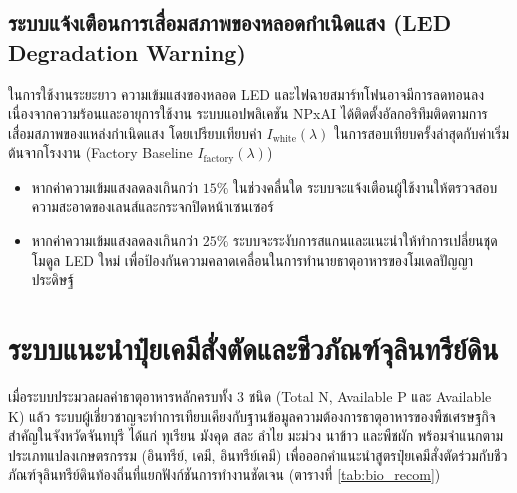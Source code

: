 \documentclass[12pt,a4paper,oneside]{book}
\begin{document}
\subsection{ระบบแจ้งเตือนการเสื่อมสภาพของหลอดกำเนิดแสง (LED Degradation Warning)}
ในการใช้งานระยะยาว ความเข้มแสงของหลอด LED และไฟฉายสมาร์ทโฟนอาจมีการลดทอนลงเนื่องจากความร้อนและอายุการใช้งาน ระบบแอปพลิเคชัน NPxAI ได้ติดตั้งอัลกอริทึมติดตามการเสื่อมสภาพของแหล่งกำเนิดแสง โดยเปรียบเทียบค่า $I_{\text{white}}(\lambda)$ ในการสอบเทียบครั้งล่าสุดกับค่าเริ่มต้นจากโรงงาน (Factory Baseline $I_{\text{factory}}(\lambda)$)
\begin{itemize}
    \item หากค่าความเข้มแสงลดลงเกินกว่า $15\%$ ในช่วงคลื่นใด ระบบจะแจ้งเตือนผู้ใช้งานให้ตรวจสอบความสะอาดของเลนส์และกระจกปิดหน้าเซนเซอร์
    \item หากค่าความเข้มแสงลดลงเกินกว่า $25\%$ ระบบจะระงับการสแกนและแนะนำให้ทำการเปลี่ยนชุดโมดูล LED ใหม่ เพื่อป้องกันความคลาดเคลื่อนในการทำนายธาตุอาหารของโมเดลปัญญาประดิษฐ์
\end{itemize}

\section{ระบบแนะนำปุ๋ยเคมีสั่งตัดและชีวภัณฑ์จุลินทรีย์ดิน}
เมื่อระบบประมวลผลค่าธาตุอาหารหลักครบทั้ง 3 ชนิด (Total N, Available P และ Available K) แล้ว ระบบผู้เชี่ยวชาญจะทำการเทียบเคียงกับฐานข้อมูลความต้องการธาตุอาหารของพืชเศรษฐกิจสำคัญในจังหวัดจันทบุรี ได้แก่ ทุเรียน มังคุด สละ ลำไย มะม่วง นาข้าว และพืชผัก พร้อมจำแนกตามประเภทแปลงเกษตรกรรม (อินทรีย์, เคมี, อินทรีย์เคมี) เพื่อออกคำแนะนำสูตรปุ๋ยเคมีสั่งตัดร่วมกับชีวภัณฑ์จุลินทรีย์ดินท้องถิ่นที่แยกฟังก์ชันการทำงานชัดเจน (ตารางที่ \ref{tab:bio_recom})
\end{document}
